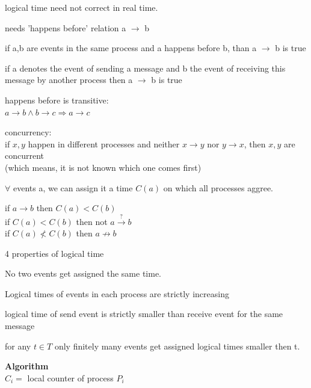 \documentclass[ngerman,a4paper]{report}
\begin{document}
\begin{compactitem}
\item logical time need not correct in real time.
\item needs 'happens before' relation a $\rightarrow$ b

\begin{compactenum}
\item if a,b are events in the same process and a happens before b, than a $\rightarrow$ b is true
\item if a denotes the event of sending a message and b the event of receiving this message by another process then a $\rightarrow$ b is true
\end{compactenum}

\item happens before is transitive:\\
$a \rightarrow b \land b \rightarrow c \Rightarrow a \rightarrow c$
\item concurrency:\\
if $x, y$ happen in different processes and neither $x \rightarrow y$ nor $y \rightarrow x$, then $x, y$ are concurrent\\
(which means, it is not known which one comes first)
\item $\forall$ events a, we can assign it a time $C(a)$ on which all processes aggree.
\item if $a \rightarrow b$ then $C(a) < C(b)$ \\
    if $C(a) < C(b)$ then not $a \xrightarrow{?} b$\\
    if $C(a) \not < C(b)$ then $ a \not \rightarrow b$\\

\item 4 properties of logical time
\begin{compactenum}
\item No two events get assigned the same time.
\item Logical times of events in each process are strictly increasing
\item logical time of send event is strictly smaller than receive event for the same message
\item for any $t \in T$ only finitely many events get assigned logical times smaller then  t.
\end{compactenum}
\end{compactitem}

\textbf{Algorithm} \\
 $C_i =$ local counter of process $P_i$
\end{document}
